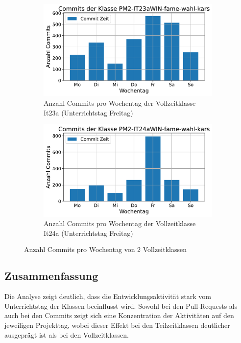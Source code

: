 \begin{figure}[htbp]
    \centering
    \begin{subfigure}[b]{0.48\textwidth}
        \centering
        \includegraphics[width=\textwidth]{Figures/commits-klasse-per-wochentag-23a.pdf}
         \caption{Anzahl Commits pro Wochentag der Vollzeitklasse It23a (Unterrichtstag Freitag)}
        \label{fig:anzahl-commits-pro-wochentag-it23a}
    \end{subfigure}
    \hfill
    \begin{subfigure}[b]{0.48\textwidth}
        \centering
        \includegraphics[width=\textwidth]{Figures/commits-klasse-per-wochentag-24a.pdf}
         \caption{Anzahl Commits pro Wochentag der Vollzeitklasse It24a (Unterrichtstag Freitag)}
        \label{fig:anzahl-commits-pro-wochentag-it24a}
    \end{subfigure}
    \caption{Anzahl Commits pro Wochentag von 2 Vollzeitklassen}
    \label{fig:anz-commits-vollzeit-pro-wochentag}
\end{figure}


\subsection{Zusammenfassung}
Die Analyse zeigt deutlich, dass die Entwicklungsaktivität stark vom Unterrichtstag der Klassen beeinflusst wird. Sowohl bei den Pull-Requests als auch bei den Commits zeigt sich eine Konzentration der Aktivitäten auf den jeweiligen Projekttag, wobei dieser Effekt bei den Teilzeitklassen deutlicher ausgeprägt ist als bei den Vollzeitklassen.

